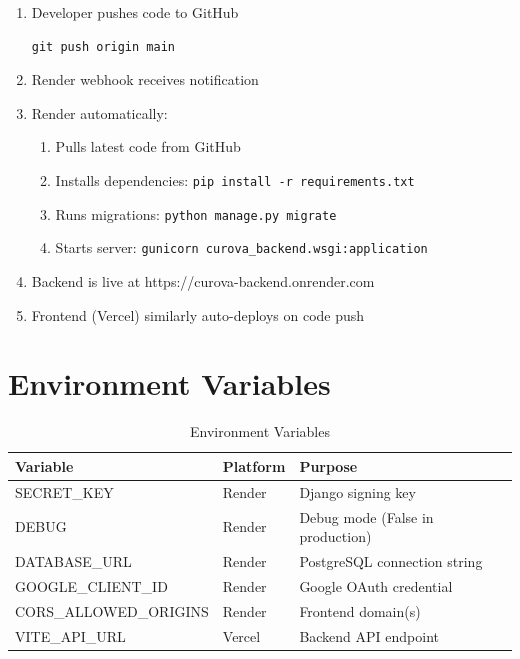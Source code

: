 \documentclass[11pt,a4paper,twoside]{report}
\begin{document}
\begin{enumerate}
    \item Developer pushes code to GitHub
    \begin{lstlisting}
git push origin main
    \end{lstlisting}
    
    \item Render webhook receives notification
    
    \item Render automatically:
    \begin{enumerate}
        \item Pulls latest code from GitHub
        \item Installs dependencies: \texttt{pip install -r requirements.txt}
        \item Runs migrations: \texttt{python manage.py migrate}
        \item Starts server: \texttt{gunicorn curova\_backend.wsgi:application}
    \end{enumerate}
    
    \item Backend is live at https://curova-backend.onrender.com
    
    \item Frontend (Vercel) similarly auto-deploys on code push
\end{enumerate}

\section{Environment Variables}

\begin{table}[H]
\centering
\small
\begin{tabular}{|l|l|p{4cm}|}
\hline
\textbf{Variable} & \textbf{Platform} & \textbf{Purpose} \\
\hline
SECRET\_KEY & Render & Django signing key \\
\hline
DEBUG & Render & Debug mode (False in production) \\
\hline
DATABASE\_URL & Render & PostgreSQL connection string \\
\hline
GOOGLE\_CLIENT\_ID & Render & Google OAuth credential \\
\hline
CORS\_ALLOWED\_ORIGINS & Render & Frontend domain(s) \\
\hline
VITE\_API\_URL & Vercel & Backend API endpoint \\
\hline
\end{tabular}
\caption{Environment Variables}
\end{table}
\end{document}
